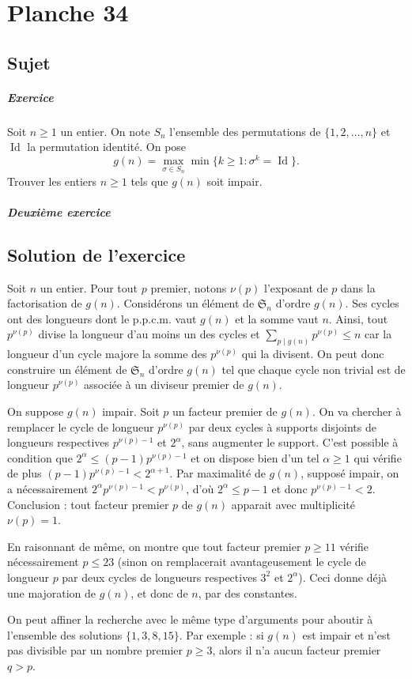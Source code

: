 \chapter{Planche 34}

\section{Sujet}

\paragraph{Exercice}
Soit $n\geqslant 1$ un entier. On note $S_n$ l'ensemble des permutations de $\{1,2,\ldots,n\}$ et $\operatorname{Id}$ la permutation identité. On pose
\[
g(n) = \max_{\sigma \in S_n} \min\{k \geqslant 1 : \sigma^k = \operatorname{Id}\}.
\]
Trouver les entiers $n \geqslant 1$ tels que $g(n)$ soit impair.

\paragraph{Deuxième exercice}

\section{Solution de l'exercice}

Soit $n$ un entier. Pour tout $p$ premier, notons $\nu(p)$ l'exposant de $p$ dans la factorisation de $g(n)$. Considérons un élément de $\mathfrak S_n$ d'ordre $g(n)$. Ses cycles ont des longueurs dont le p.p.c.m. vaut $g(n)$ et la somme vaut $n$. Ainsi, tout $p^{\nu(p)}$ divise la longueur d'au moins un des cycles et $\sum_{p\mid g(n)} p^{\nu(p)} \leq n$ car la longueur d'un cycle majore la somme des $p^{\nu(p)}$ qui la divisent. On peut donc construire un élément de $\mathfrak S_n$ d'ordre $g(n)$ tel que chaque cycle non trivial est de longueur $p^{\nu(p)}$ associée à un diviseur premier de $g(n)$.

On suppose $g(n)$ impair. Soit $p$ un facteur premier de $g(n)$. On va chercher à remplacer le cycle de longueur $p^{\nu(p)}$ par deux cycles à supports disjoints de longueurs respectives $p^{\nu(p)-1}$ et $2^\alpha$, sans augmenter le support. C'est possible à condition que $2^\alpha \leq (p-1) p^{\nu(p)-1}$ et on dispose bien d'un tel $\alpha \geq 1$ qui vérifie de plus $(p-1)p^{\nu(p)-1} < 2^{\alpha+1}$. Par maximalité de $g(n)$, supposé impair, on a nécessairement $2^\alpha p^{\nu(p)-1} < p^{\nu(p)}$, d'où $2^\alpha \leq p - 1$ et donc $p^{\nu(p)-1} < 2$. Conclusion : tout facteur premier $p$ de $g(n)$ apparait avec multiplicité $\nu(p)=1$.

En raisonnant de même, on montre que tout facteur premier $p \geq 11$ vérifie nécessairement $p \leq 23$ (sinon on remplacerait avantageusement le cycle de longueur $p$ par deux cycles de longueurs respectives $3^2$ et $2^\alpha$). Ceci donne déjà une majoration de $g(n)$, et donc de $n$, par des constantes.

On peut affiner la recherche avec le même type d'arguments pour aboutir à l'ensemble des solutions $\{1, 3,8,15\}$. Par exemple : si $g(n)$ est impair et n'est pas divisible par un nombre premier $p \geq 3$, alors il n'a aucun facteur premier $q > p$.